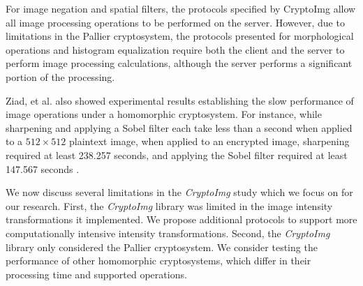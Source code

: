 For image negation and spatial filters, the protocols specified by CryptoImg allow all image processing operations to be performed on the server. However, due to limitations in the Pallier cryptosystem, the protocols presented for morphological operations and histogram equalization require both the client and the server to perform image processing calculations, although the server performs a significant portion of the processing.

Ziad, et al. also showed experimental results establishing the slow performance of image operations under a homomorphic cryptosystem. For instance, while sharpening and applying a Sobel filter each take less than a second when applied to a $512\times 512$ plaintext image, when applied to an encrypted image, sharpening required at least 238.257 seconds, and applying the Sobel filter required at least 147.567 seconds \cite{ziad_cryptoimg:_2016}.


We now discuss several limitations in the \textit{CryptoImg} study which we focus on for our research. First, the \textit{CryptoImg} library was limited in the image intensity transformations it implemented. We propose additional protocols to support more computationally intensive intensity transformations.
Second, the \textit{CryptoImg} library only considered the Pallier cryptosystem. We consider testing the performance of other homomorphic cryptosystems, which differ in their processing time and supported operations.
